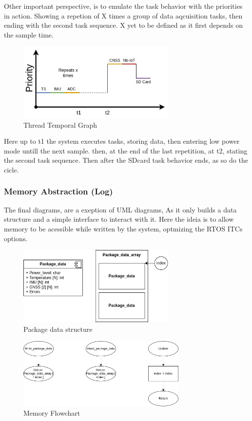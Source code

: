 Other important perspective, is to emulate the task behavior with the priorities in action. 
Showing a repetion of X times a group of data aqcuisition tasks, then ending with the second task sequence.
X yet to be defined as it first depends on the sample time. 
\begin{figure}[H]
    \centering
    \includegraphics[width=0.7\textwidth]{images/diagrams/threads/graph/threads_graph.drawio.png}  %
    \caption{Thread Temporal Graph}
    \label{fig:Thread Temporal Graph}        
\end{figure}

Here up to t1 the system executes tasks, storing data, then entering low power mode untill the next sample.
then, at the end of the last repetition, at t2, stating the second task sequence. Then after the SDcard task behavior ends, as so do the cicle.
\subsubsection{Memory Abstraction (Log)} 

The final diagrams, are a exeption of UML diagrams, As it only builds a data structure and a simple interface to interact with it.
Here the ideia is to allow memory to be acessible while written by the system, optmizing the RTOS ITCs options.
\begin{figure}[H]
    \centering
    \includegraphics[width=0.7\textwidth]{images/diagrams/data_struct/package_data.drawio.png}  %
    \caption{Package data structure}
    \label{fig:Package data structure}        
\end{figure}


\begin{figure}[H]
    \centering
    \includegraphics[width=0.75\textwidth]{images/diagrams/data_struct/fluxogram.png}  %
    \caption{Memory Flowchart}
    \label{fig:Memory Flowchart}        
\end{figure}
